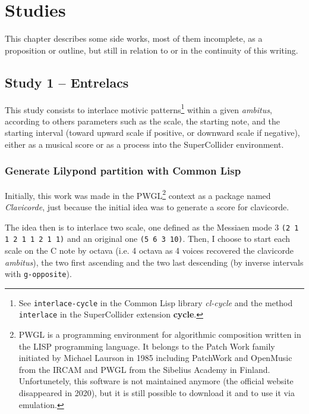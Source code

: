 \chapter*{Studies}


This chapter describes some side works, most of them incomplete, as a proposition or outline, but still in relation to or in the continuity of this writing.

\section*{Study 1 -- Entrelacs}


This study consists to interlace motivic patterns\footnote{See \texttt{interlace-cycle} in the Common Lisp library \textit{cl-cycle} and the method \texttt{interlace} in the SuperCollider extension \textbf{cycle}.} within a given \textit{ambitus}, according to others parameters such as the scale, the starting note, and the starting interval (toward upward scale if positive, or downward scale if negative), either as a musical score or as a process into the SuperCollider environment.

\subsection*{Generate Lilypond partition with Common Lisp}

Initially, this work was made in the PWGL\footnote{PWGL is a programming environment for algorithmic composition written in the LISP programming language. It belongs to the Patch Work family initiated by Michael Laurson in 1985 including PatchWork and OpenMusic from the IRCAM and PWGL from the Sibelius Academy in Finland. Unfortunetely, this software is not maintained anymore (the official website disappeared in 2020), but it is still possible to download it and to use it via emulation.} context as a package named \textit{Clavicorde}, just because the initial idea was to generate a score for clavicorde.

The idea then is to interlace two scale, one defined as the Messiaen mode 3 \texttt{(2 1 1 2 1 1 2 1 1)} and an original one \texttt{(5 6 3 10)}. Then, I choose to start each scale on the C note by octava (i.e. 4 octava as 4 voices recovered the clavicorde \textit{ambitus}), the two first ascending and the two last descending (by inverse intervals with \texttt{g-opposite}). 

